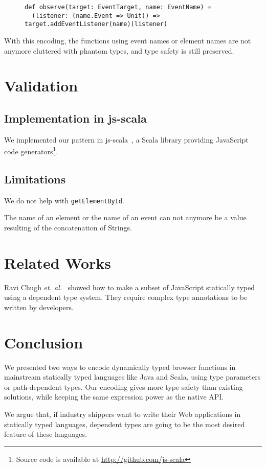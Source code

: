 \documentclass{llncs}
\newcommand{\jscode}[1]{\lstinline[language=JavaScript]|#1|}
\newcommand{\scalacode}[1]{\lstinline[language=Scala]|#1|}
\begin{document}
\begin{figure}
\begin{lstlisting}[label=lst-dt-react,caption={Partial application of \scalacode{addEventListener} using path-dependent types}]
def observe(target: EventTarget, name: EventName) =
  (listener: (name.Event => Unit)) => target.addEventListener(name)(listener)
\end{lstlisting}
\end{figure}

With this encoding, the functions using event names or element names are not anymore cluttered with phantom types, and type safety is still preserved.

\section{Validation}
\label{sec-validation}

\subsection{Implementation in js-scala}

We implemented our pattern in js-scala~\cite{Kossakowski12_JsDESL}, a Scala library providing JavaScript code generators\footnote{Source code is available at \href{http://github.com/js-scala}{http://github.com/js-scala}}.

\subsection{Limitations}

We do not help with \jscode{getElementById}.

The name of an element or the name of an event can not anymore be a value resulting of the concatenation of Strings.

\section{Related Works}
\label{sec-related}

Ravi Chugh \emph{et. al.}~\cite{Chugh12_DJS} showed how to make a subset of JavaScript statically typed using a dependent type system. They require complex type annotations to be written by developers.

\section{Conclusion}
\label{sec-conclusion}

We presented two ways to encode dynamically typed browser functions in mainstream statically typed languages like Java and Scala, using type parameters or path-dependent types. Our encoding gives more type safety than existing solutions, while keeping the same expression power as the native API.

We argue that, if industry shippers want to write their Web applications in statically typed languages, dependent types are going to be the most desired feature of these languages.



\end{document}
